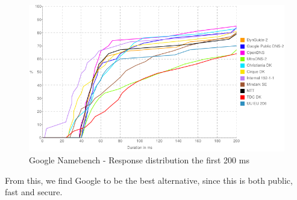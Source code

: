 \begin{figure}[H]
\centering
\includegraphics[width=150mm]{img/namebench_response_distro.png}
\caption{Google Namebench - Response distribution the first 200 ms}
\label{namebench_response_distro}
\end{figure}

From this, we find Google to be the best alternative, since this is both public, fast and secure.
